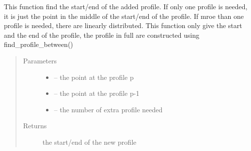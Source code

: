\documentclass[letterpaper,10pt,english]{sphinxmanual}
\begin{document}
\begin{fulllineitems}
\label{\detokenize{index:src.manage_grid_8.newp}}
This function find the start/end of the added profile. If only one profile is needed, it is just the
point in the middle of the start/end of the profile. If mroe than one profile is needed, there are linearly
distributed. This function only give the start and the end of the profile, the profile in full are constructed using
find\_profile\_between()
\begin{quote}\begin{description}
\item[{Parameters}] \leavevmode\begin{itemize}
\item {} 
 -- the point at the profile p

\item {} 
 -- the point at the profile p-1

\item {} 
 -- the number of extra profile needed

\end{itemize}

\item[{Returns}] \leavevmode
the start/end of the new profile

\end{description}\end{quote}

\end{fulllineitems}

\end{document}
